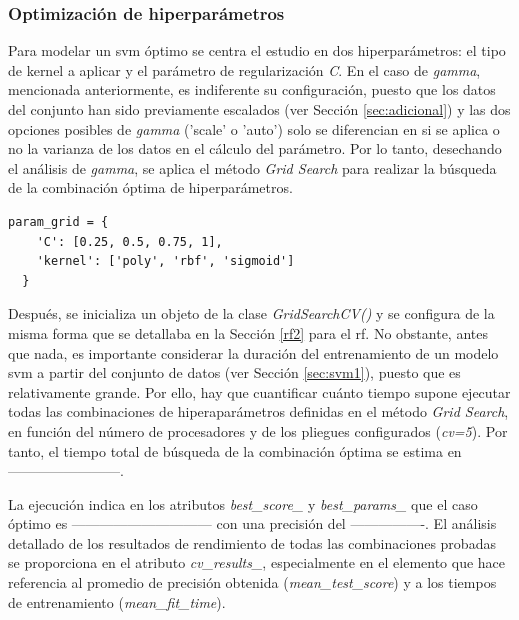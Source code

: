 \subsubsection{Optimización de hiperparámetros}

Para modelar un \gls{svm} óptimo se centra el estudio en dos hiperparámetros: el tipo de kernel a aplicar y el parámetro de regularización \textit{C}. En el caso de \textit{gamma}, mencionada anteriormente, es indiferente su configuración, puesto que los datos del conjunto han sido previamente escalados (ver Sección \ref{sec:adicional}) y las dos opciones posibles de \textit{gamma} ('scale' o 'auto') solo se diferencian en si se aplica o no la varianza de los datos en el cálculo del parámetro. Por lo tanto, desechando el análisis de \textit{gamma}, se aplica el método \textit{Grid Search} para realizar la búsqueda de la combinación óptima de hiperparámetros.

\vspace{3mm}

\begin{lstlisting}[style=Python, caption={Cuadrícula de parámetros SVM}]
  param_grid = {
    'C': [0.25, 0.5, 0.75, 1], 
    'kernel': ['poly', 'rbf', 'sigmoid']
  }
\end{lstlisting}

\vspace{3mm}

Después, se inicializa un objeto de la clase \textit{GridSearchCV()} y se configura de la misma forma que se detallaba en la Sección \ref{rf2} para el \gls{rf}. No obstante, antes que nada, es importante considerar la duración del entrenamiento de un modelo \gls{svm} a partir del conjunto de datos (ver Sección \ref{sec:svm1}), puesto que es relativamente grande. Por ello, hay que cuantificar cuánto tiempo supone ejecutar todas las combinaciones de hiperaparámetros definidas en el método \textit{Grid Search}, en función del número de procesadores y de los pliegues configurados (\textit{cv=5}). Por tanto, el tiempo total de búsqueda de la combinación óptima se estima en ------------------------.

\vspace{3mm}

La ejecución indica en los atributos \textit{best\_score\_} y \textit{best\_params\_} que el caso óptimo es ------------------------------ con una precisión del ----------------. El análisis detallado de los resultados de rendimiento de todas las combinaciones probadas se proporciona en el atributo \textit{cv\_results\_}, especialmente en el elemento que hace referencia al promedio de precisión obtenida (\textit{mean\_test\_score}) y a los tiempos de entrenamiento (\textit{mean\_fit\_time}). 


